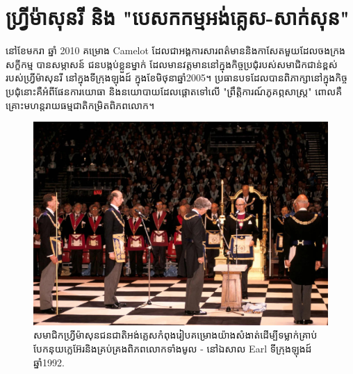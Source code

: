 \documentclass[10pt,twocolumn,letterpaper]{article}
\begin{document}
\section{ហ្រ្វីម៉ាសុនរី និង "បេសកកម្មអង់គ្លេស-សាក់សុន"}
	នៅខែមករា ឆ្នាំ 2010 គម្រោង Camelot ដែលជាអង្គការសារពត៌មាននិងកាសែតមួយដែលចងក្រងសក្ខីកម្ម បានសម្ភាសន៍\cite{4,6} ជនបង្កប់ខ្លួនម្នាក់ ដែលមានវត្តមាននៅក្នុងកិច្ចប្រជុំរបស់សមាជិកជាន់ខ្ពស់របស់ហ្វ្រីម៉ាសុនរី នៅក្នុងទីក្រុងឡុងដ៍ ក្នុងខែមិថុនាឆ្នាំ2005។ ប្រធានបទដែលបានពិភាក្សានៅក្នុងកិច្ចប្រជុំនោះគឺអំពីផែនការយោធា និងនយោបាយដែលផ្តោតទៅលើ "ព្រឹត្តិការណ៍ភូគព្ភសាស្ត្រ" ពោលគឺគ្រោះមហន្តរាយធម្មជាតិកម្រិតពិភពលោក។

\begin{figure}[b]
\begin{center}
   \includegraphics[width=1\linewidth]{freemason.jpg}
\end{center}
   \caption{សមាជិកហ្វ្រីម៉ាសុនជនជាតិអង់គ្លេស ​កំពុងរៀបគម្រោងយ៉ាងសំងាត់ដើម្បីទម្លាក់គ្រាប់បែកនុយក្លេអ៊ែរនិងគ្រប់គ្រងពិភពលោកទាំងមូល - នៅឯសាល Earl ទីក្រុងឡុងដ៍ឆ្នាំ1992\cite{5}.}
\label{fig:1}
\label{fig:onecol}
\end{figure}
\end{document}
